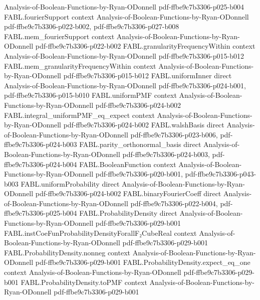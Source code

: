 \begin{theorem}
  {Analysis-of-Boolean-Functions-by-Ryan-ODonnell}
  {pdf-ffbe9c7b3306-p025-b004}
\proofstep
  {FABL.fourierSupport}
  {context}
  {Analysis-of-Boolean-Functions-by-Ryan-ODonnell}
  {pdf-ffbe9c7b3306-p022-b002,
    pdf-ffbe9c7b3306-p027-b008}
\proofstep
  {FABL.mem_fourierSupport}
  {context}
  {Analysis-of-Boolean-Functions-by-Ryan-ODonnell}
  {pdf-ffbe9c7b3306-p022-b002}
\proofstep
  {FABL.granularityFrequencyWithin}
  {context}
  {Analysis-of-Boolean-Functions-by-Ryan-ODonnell}
  {pdf-ffbe9c7b3306-p015-b012}
\proofstep
  {FABL.mem_granularityFrequencyWithin}
  {context}
  {Analysis-of-Boolean-Functions-by-Ryan-ODonnell}
  {pdf-ffbe9c7b3306-p015-b012}
\proofstep
  {FABL.uniformInner}
  {direct}
  {Analysis-of-Boolean-Functions-by-Ryan-ODonnell}
  {pdf-ffbe9c7b3306-p024-b001,
    pdf-ffbe9c7b3306-p015-b010}
\proofstep
  {FABL.uniformPMF}
  {context}
  {Analysis-of-Boolean-Functions-by-Ryan-ODonnell}
  {pdf-ffbe9c7b3306-p024-b002}
\proofstep
  {FABL.integral_uniformPMF_eq_expect}
  {context}
  {Analysis-of-Boolean-Functions-by-Ryan-ODonnell}
  {pdf-ffbe9c7b3306-p024-b002}
\proofstep
  {FABL.walshBasis}
  {direct}
  {Analysis-of-Boolean-Functions-by-Ryan-ODonnell}
  {pdf-ffbe9c7b3306-p023-b006,
    pdf-ffbe9c7b3306-p024-b003}
\proofstep
  {FABL.parity_orthonormal_basis}
  {direct}
  {Analysis-of-Boolean-Functions-by-Ryan-ODonnell}
  {pdf-ffbe9c7b3306-p024-b003,
    pdf-ffbe9c7b3306-p024-b004}
\proofstep
  {FABL.BooleanFunction}
  {context}
  {Analysis-of-Boolean-Functions-by-Ryan-ODonnell}
  {pdf-ffbe9c7b3306-p020-b001,
    pdf-ffbe9c7b3306-p043-b003}
\proofstep
  {FABL.uniformProbability}
  {direct}
  {Analysis-of-Boolean-Functions-by-Ryan-ODonnell}
  {pdf-ffbe9c7b3306-p024-b002}
\proofstep
  {FABL.binaryFourierCoeff}
  {direct}
  {Analysis-of-Boolean-Functions-by-Ryan-ODonnell}
  {pdf-ffbe9c7b3306-p022-b004,
    pdf-ffbe9c7b3306-p025-b004}
\proofstep
  {FABL.ProbabilityDensity}
  {direct}
  {Analysis-of-Boolean-Functions-by-Ryan-ODonnell}
  {pdf-ffbe9c7b3306-p029-b001}
\proofstep
  {FABL.instCoeFunProbabilityDensityForallF₂CubeReal}
  {context}
  {Analysis-of-Boolean-Functions-by-Ryan-ODonnell}
  {pdf-ffbe9c7b3306-p029-b001}
\proofstep
  {FABL.ProbabilityDensity.nonneg}
  {context}
  {Analysis-of-Boolean-Functions-by-Ryan-ODonnell}
  {pdf-ffbe9c7b3306-p029-b001}
\proofstep
  {FABL.ProbabilityDensity.expect_eq_one}
  {context}
  {Analysis-of-Boolean-Functions-by-Ryan-ODonnell}
  {pdf-ffbe9c7b3306-p029-b001}
\proofstep
  {FABL.ProbabilityDensity.toPMF}
  {context}
  {Analysis-of-Boolean-Functions-by-Ryan-ODonnell}
  {pdf-ffbe9c7b3306-p029-b001}
\proofstep

\end{theorem}
